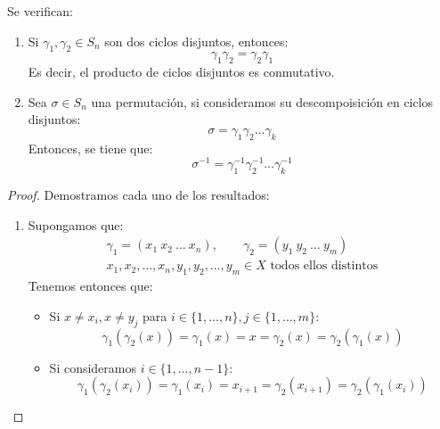 \begin{prop}
    Se verifican:
    \begin{enumerate}
        \item Si $\gamma_1,\gamma_2\in S_n$ son dos ciclos disjuntos, entonces:
            \begin{equation*}
                \gamma_1\gamma_2 = \gamma_2\gamma_1
            \end{equation*}
            Es decir, el producto de ciclos disjuntos es conmutativo.
        \item Sea $\sigma\in S_n$ una permutación, si consideramos su descompoisición en ciclos disjuntos:
            \begin{equation*}
                \sigma = \gamma_1\gamma_2\ldots\gamma_k
            \end{equation*}
            Entonces, se tiene que:
            \begin{equation*}
                \sigma^{-1} = \gamma_1^{-1}\gamma_2^{-1}\ldots\gamma_k^{-1}
            \end{equation*}
    \end{enumerate}
    \begin{proof}
        Demostramos cada uno de los resultados:
        \begin{enumerate}
            \item Supongamos que:
                \begin{gather*}
                    \gamma_1 = (x_1\ x_2\ \ldots\ x_n), \qquad \gamma_2 = (y_1\ y_2\ \ldots\ y_m) \\
                    x_1,x_2,\ldots,x_n,y_1,y_2,\ldots,y_m \in X \text{\ todos ellos distintos}
                \end{gather*}
                Tenemos entonces que:
                \begin{itemize}
                    \item Si $x\neq x_i, x\neq y_j$ para $i \in \{1,\ldots,n\}, j\in \{1,\ldots,m\}$:
                        \begin{equation*}
                            \gamma_1(\gamma_2(x)) = \gamma_1(x) = x = \gamma_2(x) = \gamma_2(\gamma_1(x))
                        \end{equation*}
                    \item Si consideramos $i \in \{1,\ldots,n-1\}$:
                        \begin{equation*}
                            \gamma_1(\gamma_2(x_i)) = \gamma_1(x_i) = x_{i+1} = \gamma_2(x_{i+1}) = \gamma_2(\gamma_1(x_i))

\end{equation*}
\end{itemize}
\end{enumerate}
\end{proof}
\end{prop}
